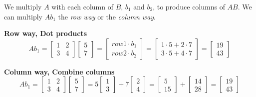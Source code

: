 \noindent We multiply $A$ with each column of $B$, $b_1$ and $b_2$, to produce columns of $AB$. We can multiply $Ab_1$ the \textit{row way} or the \textit{column way}. \\
\begin{mdframed}

	\noindent\textbf{Row way, Dot products}
	\[
		Ab_1 = \begin{bmatrix}
			1 & 2 \\
			3 & 4
		\end{bmatrix}
		\begin{bmatrix}
			5 \\
			7
		\end{bmatrix}
		=
		\begin{bmatrix}
			row 1 \cdot b_1 \\
			row 2 \cdot b_2
		\end{bmatrix}
		=
		\begin{bmatrix}
			1 \cdot 5 + 2 \cdot 7 \\ 3 \cdot 5 + 4 \cdot 7
		\end{bmatrix}
		=
		\begin{bmatrix}
			19 \\ 43
		\end{bmatrix}
	\]

	\noindent\textbf{Column way, Combine columns}
	\[
		Ab_1 = \begin{bmatrix}
			1 & 2 \\
			3 & 4
		\end{bmatrix}
		\begin{bmatrix}
			5 \\
			7
		\end{bmatrix}
		=
		5\begin{bmatrix}
			1 \\ 3
		\end{bmatrix}
		+ 7\begin{bmatrix}
			2 \\ 4
		\end{bmatrix}
		=
		\begin{bmatrix}
			5 \\ 15
		\end{bmatrix}
		+
		\begin{bmatrix}
			14 \\ 28
		\end{bmatrix}
		=
		\begin{bmatrix}
			19 \\ 43
		\end{bmatrix}
	\]
\end{mdframed}

